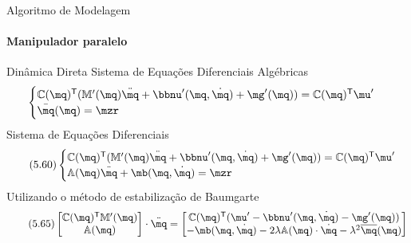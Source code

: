 \documentclass[25pt,landscape]{beamer}
\begin{document}
\begin{frame}{Algoritmo de Modelagem}
    \framesubtitle{Manipulador paralelo}
    \begin{block}{Dinâmica Direta}
    	\pause
    	Sistema de Equações Diferenciais Algébricas
    	\begin{equation*}
			\begin{cases}
			\mC(\mq)^\msT (   \mM'(\mq)\ddot{\mq} + \mnu'(\mq,\dot{\mq}) + \mg'(\mq) ) = \mC(\mq)^\msT \mu' \\
			\bar{\mq}(\mq) = \mzr
			\end{cases}
		\end{equation*}
		\pause
		Sistema de Equações Diferenciais
    	\begin{equation} \tag{5.60}
			\begin{cases}
			\mC(\mq)^\msT (   \mM'(\mq)\ddot{\mq} + \mnu'(\mq,\dot{\mq}) + \mg'(\mq) ) = \mC(\mq)^\msT \mu' \\
			\mA(\mq)\ddot{\mq} + \mb(\mq,\dot{\mq}) = \mzr
			\end{cases}
		\end{equation}
		\pause
		Utilizando o método de estabilização de Baumgarte
		\begin{equation} \tag{5.65}
			\begin{bmatrix}
				\mC(\mq)^\msT \mM'(\mq) \\
				\mA(\mq)
			\end{bmatrix}
			\cdot
			\ddot{\mq}
			=
			\begin{bmatrix}
				\mC(\mq)^\msT (\mu' - \mnu'(\mq,\dot{\mq}) - \mg'(\mq) ) \\
				-\mb(\mq,\dot{\mq}) -
				2\lambda
				\mA(\mq) \cdot \dot{\mq} -
				\lambda^2
				\overline{\mq}(\mq) \\
			\end{bmatrix}
		\end{equation}
    \end{block}
\end{frame}
\end{document}
